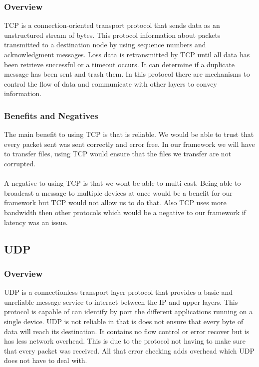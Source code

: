 \subsubsection{Overview}
TCP is a connection-oriented transport protocol that sends data as an unstructured stream of bytes.\cite{Cisco} This protocol information about packets transmitted to a destination node by using sequence numbers and acknowledgment messages. Loss data is retransmitted by TCP until all data has been retrieve successful or a timeout occurs. It can determine if a duplicate message has been sent and trash them. In this protocol there are mechanisms to control the flow of data and communicate with other layers to convey information. \cite{Cisco}

\subsubsection{Benefits and Negatives}
The main benefit to using TCP is that is reliable. We would be able to trust that every packet sent was sent correctly and error free. In our framework we will have to transfer files, using TCP would ensure that the files we transfer are not corrupted. 
\\ \\
A negative to using TCP is that we wont be able to multi cast. Being able to broadcast a message to multiple devices at once would be a benefit for our framework but TCP would not allow us to do that. Also TCP uses more bandwidth then other protocols which would be a negative to our framework if latency was an issue.

\subsection{UDP}
\subsubsection{Overview}
UDP is a connectionless transport layer protocol that provides a basic and unreliable message service to interact between the IP and upper layers.\cite{kits} This protocol is capable of can identify by port the different applications running on a single device. UDP is not reliable in that is does not ensure that every byte of data will reach its destination. It contains no flow control or error recover but is has less network overhead. This is due to the protocol not having to make sure that every packet was received. All that error checking adds overhead which UDP does not have to deal with. \cite{kits}

